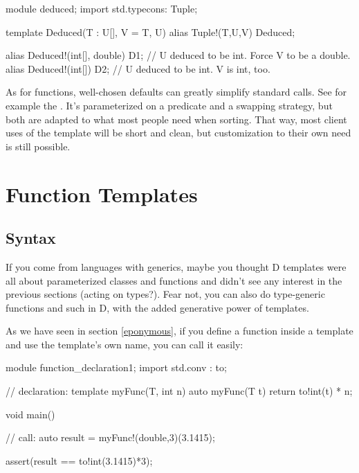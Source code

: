 \begin{dcode}
module deduced;
import std.typecons: Tuple;

template Deduced(T : U[], V = T, U)
{
    alias Tuple!(T,U,V) Deduced;
}

alias Deduced!(int[], double) D1; // U deduced to be int. Force V to be a double.
alias Deduced!(int[]) D2; // U deduced to be int. V is int, too.
\end{dcode}



As for functions, well-chosen defaults can greatly simplify standard calls. See for example the . It's parameterized on a predicate and a swapping strategy, but both are adapted to what most people need when sorting. That way, most client uses of the template will be short and clean, but customization to their own need is still possible.



\section{Function Templates}\label{functiontemplates}

\subsection{Syntax}\label{functiontemplatessyntax}

If you come from languages with generics, maybe you thought D templates were all about parameterized classes and functions and didn't see any interest in the previous sections (acting on types?). Fear not, you can also do type-generic functions and such in D, with the added generative power of templates.

As we have seen in section \ref{eponymous}, if you define a function inside a template and use the template's own name, you can call it easily:

\begin{dcode}
module function_declaration1;
import std.conv : to;

// declaration:
template myFunc(T, int n)
{
    auto myFunc(T t) { return to!int(t) * n;}
}

void main()
{
    // call:
    auto result = myFunc!(double,3)(3.1415);

    assert(result == to!int(3.1415)*3);
}
\end{dcode}

